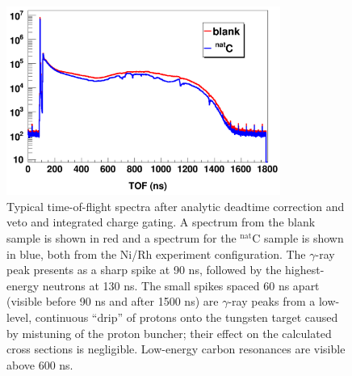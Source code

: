 \begin{figure}[tb]
    \centering
    \includegraphics[width=0.8\textwidth]{figures/exampleTOFSpectrum.png}
    \caption[Typical time-of-flight spectrum after timing and deadtime corrections]
    {
        Typical time-of-flight spectra after analytic deadtime correction and
        veto and integrated charge gating. A spectrum from the blank sample is shown in
        red and a spectrum for the $^{\text{nat}}$C sample is shown in blue, both from the Ni/Rh 
        experiment configuration.
        The $\gamma$-ray peak presents as a sharp spike at 90 ns, followed by
        the highest-energy neutrons at 130 ns. The small spikes spaced 60 ns
        apart (visible before 90 ns and after 1500
        ns) are $\gamma$-ray peaks from a low-level, continuous ``drip'' 
        of protons onto the tungsten target caused by mistuning of the proton 
        buncher; their effect on the calculated cross sections is negligible. Low-energy carbon
        resonances are visible above 600 ns.
    }
    \label{ExampleTOFSpectrum}
\end{figure}


